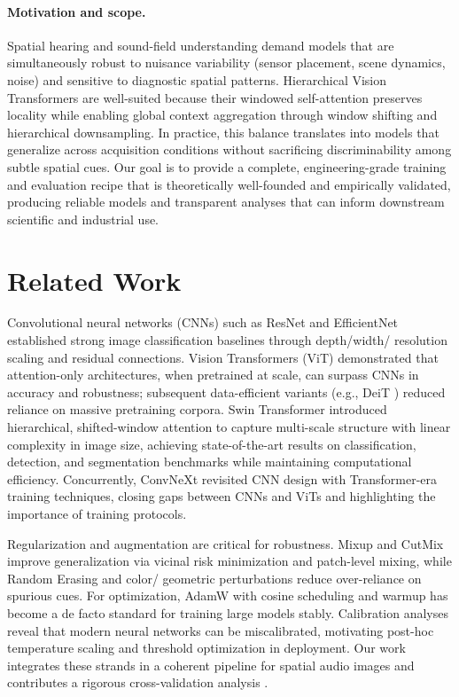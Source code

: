 \documentclass[11pt,a4paper]{article}
\begin{document}
\paragraph{Motivation and scope.} Spatial hearing and sound-field understanding demand models that are simultaneously robust to nuisance variability (sensor placement, scene dynamics, noise) and sensitive to diagnostic spatial patterns. Hierarchical Vision Transformers are well-suited because their windowed self-attention preserves locality while enabling global context aggregation through window shifting and hierarchical downsampling. In practice, this balance translates into models that generalize across acquisition conditions without sacrificing discriminability among subtle spatial cues. Our goal is to provide a complete, engineering-grade training and evaluation recipe that is theoretically well-founded and empirically validated, producing reliable models and transparent analyses that can inform downstream scientific and industrial use.

\section{Related Work}
Convolutional neural networks (CNNs) such as ResNet \cite{he2016deep} and EfficientNet \cite{tan2019efficientnet} established strong image classification baselines through depth/width/ resolution scaling and residual connections. Vision Transformers (ViT) \cite{dosovitskiy2021vit} demonstrated that attention-only architectures, when pretrained at scale, can surpass CNNs in accuracy and robustness; subsequent data-efficient variants (e.g., DeiT \cite{touvron2021deit}) reduced reliance on massive pretraining corpora. Swin Transformer \cite{liu2021swin} introduced hierarchical, shifted-window attention to capture multi-scale structure with linear complexity in image size, achieving state-of-the-art results on classification, detection, and segmentation benchmarks while maintaining computational efficiency. Concurrently, ConvNeXt \cite{liu2022convnext} revisited CNN design with Transformer-era training techniques, closing gaps between CNNs and ViTs and highlighting the importance of training protocols.

Regularization and augmentation are critical for robustness. Mixup \cite{zhang2018mixup} and CutMix \cite{yun2019cutmix} improve generalization via vicinal risk minimization and patch-level mixing, while Random Erasing \cite{zhong2020randomerasing} and color/ geometric perturbations reduce over-reliance on spurious cues. For optimization, AdamW \cite{loshchilov2017decoupled} with cosine scheduling and warmup \cite{loshchilov2017sgdr,goyal2017accurate} has become a de facto standard for training large models stably. Calibration analyses \cite{guo2017calibration} reveal that modern neural networks can be miscalibrated, motivating post-hoc temperature scaling and threshold optimization in deployment. Our work integrates these strands in a coherent pipeline for spatial audio images and contributes a rigorous cross-validation analysis \cite{kohavi1995cv,dietterich1998approximate,demsar2006statistical}.
\end{document}
